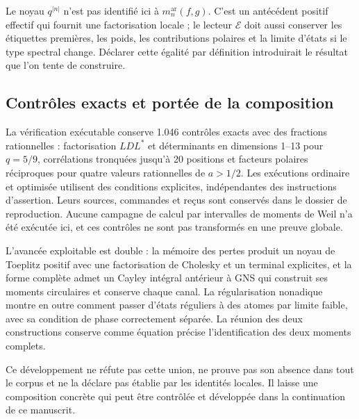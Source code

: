 Le noyau \(q^{|n|}\) n'est pas identifié ici à \(m_n^{\mathrm{ar}}(f,g)\). C'est un antécédent positif effectif qui fournit une factorisation locale ; le lecteur \(\mathcal E\) doit aussi conserver les étiquettes premières, les poids, les contributions polaires et la limite d'états si le type spectral change. Déclarer cette égalité par définition introduirait le résultat que l'on tente de construire.


\subsection{Contrôles exacts et portée de la composition}
\label{viii:tm-add-m8}

% 
La vérification exécutable conserve 1.046 contrôles exacts avec des fractions rationnelles : factorisation \(LDL^*\) et déterminants en dimensions 1–13 pour \(q=5/9\), corrélations tronquées jusqu'à 20 positions et facteurs polaires réciproques pour quatre valeurs rationnelles de \(a>1/2\). Les exécutions ordinaire et optimisée utilisent des conditions explicites, indépendantes des instructions d'assertion. Leurs sources, commandes et reçus sont conservés dans le dossier de reproduction. Aucune campagne de calcul par intervalles de moments de Weil n'a été exécutée ici, et ces contrôles ne sont pas transformés en une preuve globale.

L'avancée exploitable est double : la mémoire des pertes produit un noyau de Toeplitz positif avec une factorisation de Cholesky et un terminal explicites, et la forme complète admet un Cayley intégral antérieur à GNS qui construit ses moments circulaires et conserve chaque canal. La régularisation nonadique montre en outre comment passer d'états réguliers à des atomes par limite faible, avec sa condition de phase correctement séparée. La réunion des deux constructions conserve comme équation précise l'identification des deux moments complets.

Ce développement ne réfute pas cette union, ne prouve pas son absence dans tout le corpus et ne la déclare pas établie par les identités locales. Il laisse une composition concrète qui peut être contrôlée et développée dans la continuation de ce manuscrit.
